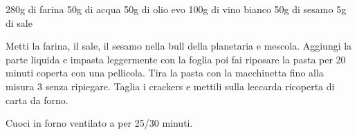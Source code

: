 \begin{ingreds}
	280g di farina
	50g di acqua
	50g di olio evo
	100g di vino bianco
	50g di sesamo
	5g di sale
\end{ingreds}

\begin{method}
	Metti la farina, il sale, il sesamo nella bull della planetaria e mescola. Aggiungi la parte liquida e impasta leggermente con la foglia poi fai riposare la pasta per 20 minuti coperta con una pellicola.
	Tira la pasta con la macchinetta fino alla misura 3 senza ripiegare. Taglia i crackers e mettili sulla leccarda ricoperta di carta da forno.

	Cuoci in forno ventilato a  per 25/30 minuti.
\end {method}

